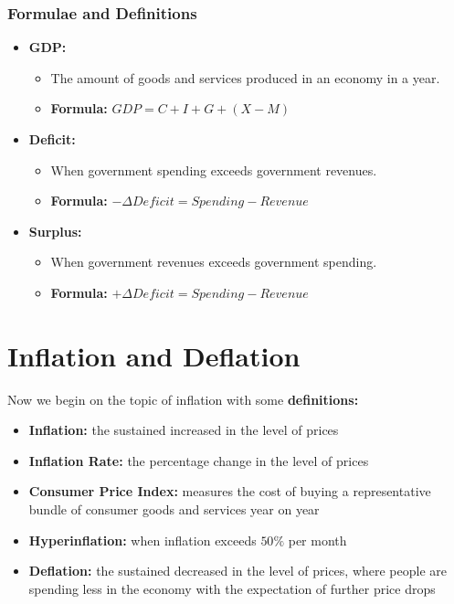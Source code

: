 \documentclass[12pt, letterpaper]{article}
\begin{document}
\subsubsection{Formulae and Definitions}
\begin{itemize}
	\item \textbf{GDP:}
		\begin{itemize}
			\item The amount of goods and services produced in an economy in a year.
			\item \textbf{Formula:} $GDP = C + I + G + (X-M)$
		\end{itemize}
	\item \textbf{Deficit:}
		\begin{itemize}
			\item When government spending exceeds government revenues.
			\item \textbf{Formula:} $-\Delta Deficit = Spending - Revenue$
		\end{itemize}	
	\item \textbf{Surplus:}
		\begin{itemize}
			\item When government revenues exceeds government spending.
			\item \textbf{Formula:} $+\Delta Deficit = Spending - Revenue$
		\end{itemize}	
\end{itemize}


\newpage
\section{Inflation and Deflation}
Now we begin on the topic of inflation with some \textbf{definitions:}
\begin{itemize}
	\item \textbf{Inflation:} the sustained increased in the level of prices
	\item \textbf{Inflation Rate:} the percentage change in the level of prices
	\item \textbf{Consumer Price Index:} measures the cost of buying a representative bundle of consumer goods and services year on year
	\item \textbf{Hyperinflation:} when inflation exceeds $50\%$ per month
	\item \textbf{Deflation:} the sustained decreased in the level of prices, where people are spending less in the economy with the expectation of further price drops
\end{itemize}
\end{document}
